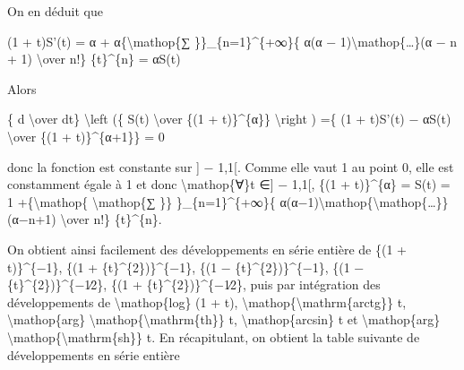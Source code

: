 \documentclass[]{article}
\begin{document}
On en déduit que

(1 + t)S'(t) = α + α\{\textbackslash{}mathop\{∑
\}\}\_\{n=1\}\^{}\{+∞\}\{ α(α − 1)\textbackslash{}mathop\{\ldots{}\}(α −
n + 1) \textbackslash{}over n!\} \{t\}\^{}\{n\} = αS(t)

Alors

\{ d \textbackslash{}over dt\} \textbackslash{}left (\{ S(t)
\textbackslash{}over \{(1 + t)\}\^{}\{α\}\} \textbackslash{}right ) =\{
(1 + t)S'(t) − αS(t) \textbackslash{}over \{(1 + t)\}\^{}\{α+1\}\} = 0

donc la fonction est constante sur {]} − 1,1{[}. Comme elle vaut 1 au
point 0, elle est constamment égale à 1 et donc
\textbackslash{}mathop\{∀\}t ∈{]} − 1,1{[}, \{(1 + t)\}\^{}\{α\} = S(t)
= 1 +\{\textbackslash{}mathop\{ \textbackslash{}mathop\{∑ \}\}
\}\_\{n=1\}\^{}\{+∞\}\{
α(α−1)\textbackslash{}mathop\{\textbackslash{}mathop\{\ldots{}\}\}(α−n+1)
\textbackslash{}over n!\} \{t\}\^{}\{n\}.

On obtient ainsi facilement des développements en série entière de \{(1
+ t)\}\^{}\{−1\}, \{(1 + \{t\}\^{}\{2\})\}\^{}\{−1\}, \{(1 −
\{t\}\^{}\{2\})\}\^{}\{−1\}, \{(1 − \{t\}\^{}\{2\})\}\^{}\{−1∕2\}, \{(1
+ \{t\}\^{}\{2\})\}\^{}\{−1∕2\}, puis par intégration des développements
de \textbackslash{}mathop\{log\} (1 + t),
\textbackslash{}mathop\{\textbackslash{}mathrm\{arctg\}\} t,
\textbackslash{}mathop\{arg\}
\textbackslash{}mathop\{\textbackslash{}mathrm\{th\}\} t,
\textbackslash{}mathop\{arcsin\} t et \textbackslash{}mathop\{arg\}
\textbackslash{}mathop\{\textbackslash{}mathrm\{sh\}\} t. En
récapitulant, on obtient la table suivante de développements en série
entière
\end{document}
